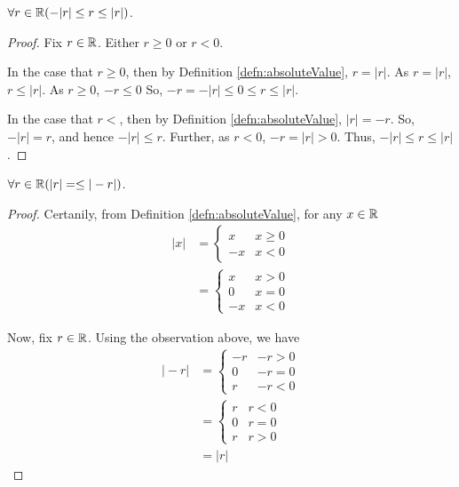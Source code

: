\begin{lem}
\label{lem:realIsBoundedAboveAndBelowItsAbsoluteValue}
  $\forall r\in\mathbb{R}(-\vert r\vert\leq r \leq\vert r\vert)$.
\end{lem}
\begin{proof}
  Fix $r\in\mathbb{R}$.
  Either $r\geq 0$ or $r<0$.

  In the case that $r\geq0$, then by Definition \ref{defn:absoluteValue}, $r=\vert r\vert$.
  As $r=\vert r\vert$, $r\leq\vert r\vert$.
  As $r\geq 0$, $-r\leq0$
  So, $-r=-\vert r\vert \leq 0\leq r\leq\vert r\vert$.

  In the case that $r<$, then by Definition \ref{defn:absoluteValue}, $\vert r\vert=-r$.
  So, $-\vert r\vert=r$, and hence $-\vert r \vert\leq r$.
  Further, as $r<0$, $-r=\vert r\vert>0$.
  Thus, $-\vert r\vert \leq r\leq\vert r\vert$.
\end{proof}

\begin{lem}
\label{lem:absoluteValueIsSymetric}
  $\forall r\in\mathbb{R}(\vert r\vert=\leq\vert -r\vert)$.
\end{lem}
\begin{proof}
  Certanily, from Definition \ref{defn:absoluteValue}, for any $x\in\mathbb{R}$
  \begin{align*}
    \vert x\vert &= \begin{cases}
        x & x\geq 0 \\
        -x& x < 0
     \end{cases}\\
      &= \begin{cases}
          x & x> 0 \\
          0 & x=0 \\
          -x& x < 0
       \end{cases}
  \end{align*}


  Now, fix $r\in\mathbb{R}$.
  Using the observation above, we have
  \begin{align*}
    \vert -r \vert &= \begin{cases}
                        -r &-r > 0 \\
                        0 & -r = 0 \\
                        r & -r < 0
                      \end{cases}\\
                  &= \begin{cases}
                        r & r < 0 \\
                        0 & r = 0 \\
                        r & r > 0
                      \end{cases}\\
                  &= \vert r \vert
  \end{align*}
\end{proof}


